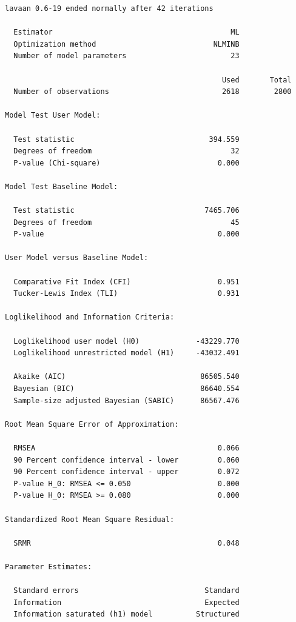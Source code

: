 \documentclass[
  letterpaper,
  DIV=11,
  numbers=noendperiod]{scrreprt}
\begin{document}
\begin{verbatim}
lavaan 0.6-19 ended normally after 42 iterations

  Estimator                                         ML
  Optimization method                           NLMINB
  Number of model parameters                        23

                                                  Used       Total
  Number of observations                          2618        2800

Model Test User Model:
                                                      
  Test statistic                               394.559
  Degrees of freedom                                32
  P-value (Chi-square)                           0.000

Model Test Baseline Model:

  Test statistic                              7465.706
  Degrees of freedom                                45
  P-value                                        0.000

User Model versus Baseline Model:

  Comparative Fit Index (CFI)                    0.951
  Tucker-Lewis Index (TLI)                       0.931

Loglikelihood and Information Criteria:

  Loglikelihood user model (H0)             -43229.770
  Loglikelihood unrestricted model (H1)     -43032.491
                                                      
  Akaike (AIC)                               86505.540
  Bayesian (BIC)                             86640.554
  Sample-size adjusted Bayesian (SABIC)      86567.476

Root Mean Square Error of Approximation:

  RMSEA                                          0.066
  90 Percent confidence interval - lower         0.060
  90 Percent confidence interval - upper         0.072
  P-value H_0: RMSEA <= 0.050                    0.000
  P-value H_0: RMSEA >= 0.080                    0.000

Standardized Root Mean Square Residual:

  SRMR                                           0.048

Parameter Estimates:

  Standard errors                             Standard
  Information                                 Expected
  Information saturated (h1) model          Structured


\end{verbatim}
\end{document}
